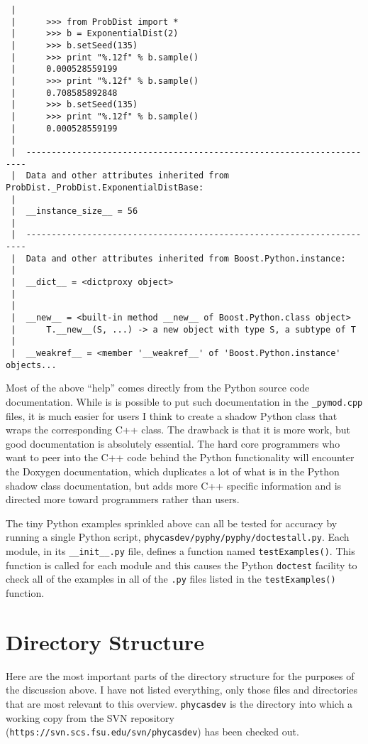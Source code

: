 \documentclass[10pt]{article}
\newcommand{\svnurl}{https://svn.scs.fsu.edu/svn/phycasdev}
\begin{document}
{\begin{verbatim}
 |
 |      >>> from ProbDist import *
 |      >>> b = ExponentialDist(2)
 |      >>> b.setSeed(135)
 |      >>> print "%.12f" % b.sample()
 |      0.000528559199
 |      >>> print "%.12f" % b.sample()
 |      0.708585892848
 |      >>> b.setSeed(135)
 |      >>> print "%.12f" % b.sample()
 |      0.000528559199
 |
 |  ----------------------------------------------------------------------
 |  Data and other attributes inherited from ProbDist._ProbDist.ExponentialDistBase:
 |
 |  __instance_size__ = 56
 |
 |  ----------------------------------------------------------------------
 |  Data and other attributes inherited from Boost.Python.instance:
 |
 |  __dict__ = <dictproxy object>
 |
 |
 |  __new__ = <built-in method __new__ of Boost.Python.class object>
 |      T.__new__(S, ...) -> a new object with type S, a subtype of T
 |
 |  __weakref__ = <member '__weakref__' of 'Boost.Python.instance' objects...
\end{verbatim}
}

Most of the above ``help'' comes directly from the Python source code documentation. While is is possible to put such documentation in the {\tt *\_pymod.cpp} files, it is much easier for users I think to create a shadow Python class that wraps the corresponding C++ class. The drawback is that it is more work, but good documentation is absolutely essential. The hard core programmers who want to peer into the C++ code behind the Python functionality will encounter the Doxygen documentation, which duplicates a lot of what is in the Python shadow class documentation, but adds more C++ specific information and is directed more toward programmers rather than users.

The tiny Python examples sprinkled above can all be tested for accuracy by running a single Python script, {\tt phycasdev/pyphy/pyphy/doctestall.py}. Each module, in its {\tt \_\_init\_\_.py} file, defines a function named {\tt testExamples()}. This function is called for each module and this causes the Python {\tt doctest} facility to check all of the examples in all of the {\tt .py} files listed in the {\tt testExamples()} function.

\section{Directory Structure}

Here are the most important parts of the directory structure for the purposes of the discussion above. I have not listed everything, only those files and directories that are most relevant to this overview. {\tt phycasdev} is the directory into which a working copy from the SVN repository ({\tt \svnurl}) has been checked out.
\end{document}
